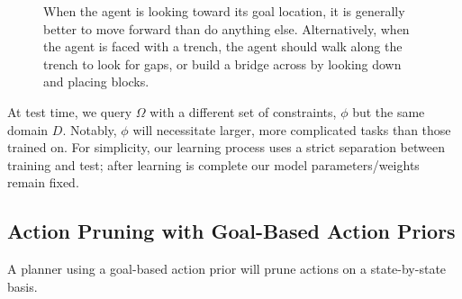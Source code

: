 \documentclass[11pt]{article}
\begin{document}
\begin{figure}
\centering
{}
\label{fig:example_affs}
\caption{When the agent is looking toward its goal location, it is generally better to move forward than do anything else. Alternatively, when the agent is faced with a trench, the agent should walk along the trench to look for gaps, or build a bridge across by looking down and placing blocks.}
\end{figure}

At test time, we query $\Omega$ with a different set of constraints, $\phi$ but the same domain $D$. Notably, $\phi$ will necessitate larger, more complicated tasks than those trained on. For simplicity, our learning process uses a strict separation between training and test; after learning is complete our model parameters/weights remain fixed.

\subsection{Action Pruning with Goal-Based Action Priors}
\label{sec:action_pruning}
A planner using a goal-based action prior will prune actions on a state-by-state basis. 
\end{document}

